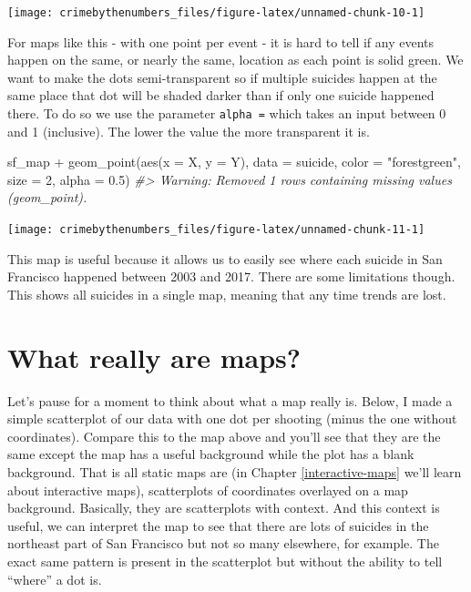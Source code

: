 \documentclass[
]{krantz}
\makeatletter
\newenvironment{Shaded}{\begin{snugshade}}{\end{snugshade}}
\newcommand{\AttributeTok}[1]{\textcolor[rgb]{0.61,0.61,0.61}{#1}}
\newcommand{\CommentTok}[1]{\textcolor[rgb]{0.37,0.37,0.37}{\textit{#1}}}
\newcommand{\DecValTok}[1]{\textcolor[rgb]{0.06,0.06,0.06}{#1}}
\newcommand{\FloatTok}[1]{\textcolor[rgb]{0.06,0.06,0.06}{#1}}
\newcommand{\FunctionTok}[1]{\textcolor[rgb]{0,0,0}{#1}}
\newcommand{\NormalTok}[1]{#1}
\newcommand{\SpecialCharTok}[1]{\textcolor[rgb]{0,0,0}{#1}}
\newcommand{\StringTok}[1]{\textcolor[rgb]{0.5,0.5,0.5}{#1}}
\newenvironment{kframe}{%
\medskip{}
\setlength{\fboxsep}{.8em}
 \def\at@end@of@kframe{}%
 \ifinner\ifhmode%
  \def\at@end@of@kframe{\end{minipage}}%
  \begin{minipage}{\columnwidth}%
 \fi\fi%
 \def\FrameCommand##1{\hskip\@totalleftmargin \hskip-\fboxsep
 \colorbox{shadecolor}{##1}\hskip-\fboxsep
     \hskip-\linewidth \hskip-\@totalleftmargin \hskip\columnwidth}%
 \MakeFramed {\advance\hsize-\width
   \@totalleftmargin\z@ \linewidth\hsize
   \@setminipage}}%
 {\par\unskip\endMakeFramed%
 \at@end@of@kframe}
\renewenvironment{Shaded}{\begin{kframe}}{\end{kframe}}
\makeatother
\begin{document}
\begin{center}\texttt{[image: crimebythenumbers\_files/figure-latex/unnamed-chunk-10-1]} \end{center}

For maps like this - with one point per event - it is hard to tell if any events happen on the same, or nearly the same, location as each point is solid green. We want to make the dots semi-transparent so if multiple suicides happen at the same place that dot will be shaded darker than if only one suicide happened there. To do so we use the parameter \texttt{alpha\ =} which takes an input between 0 and 1 (inclusive). The lower the value the more transparent it is.

\begin{Shaded}
\begin{Highlighting}[]
\NormalTok{sf\_map }\SpecialCharTok{+}
  \FunctionTok{geom\_point}\NormalTok{(}\FunctionTok{aes}\NormalTok{(}\AttributeTok{x =}\NormalTok{ X, }\AttributeTok{y =}\NormalTok{ Y),}
             \AttributeTok{data  =}\NormalTok{ suicide,}
             \AttributeTok{color =} \StringTok{"forestgreen"}\NormalTok{,}
             \AttributeTok{size  =} \DecValTok{2}\NormalTok{,}
             \AttributeTok{alpha =} \FloatTok{0.5}\NormalTok{)}
\CommentTok{\#\textgreater{} Warning: Removed 1 rows containing missing values (geom\_point).}
\end{Highlighting}
\end{Shaded}

\begin{center}\texttt{[image: crimebythenumbers\_files/figure-latex/unnamed-chunk-11-1]} \end{center}

This map is useful because it allows us to easily see where each suicide in San Francisco happened between 2003 and 2017. There are some limitations though. This shows all suicides in a single map, meaning that any time trends are lost.

\hypertarget{what-really-are-maps}{%
\section{What really are maps?}\label{what-really-are-maps}}

Let's pause for a moment to think about what a map really is. Below, I made a simple scatterplot of our data with one dot per shooting (minus the one without coordinates). Compare this to the map above and you'll see that they are the same except the map has a useful background while the plot has a blank background. That is all static maps are (in Chapter \ref{interactive-maps} we'll learn about interactive maps), scatterplots of coordinates overlayed on a map background. Basically, they are scatterplots with context. And this context is useful, we can interpret the map to see that there are lots of suicides in the northeast part of San Francisco but not so many elsewhere, for example. The exact same pattern is present in the scatterplot but without the ability to tell ``where'' a dot is.
\end{document}
